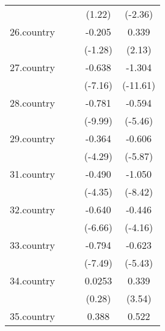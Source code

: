 {\begin{tabular}{l*{4}{c}}
            &                     &                     &      (1.22)         &     (-2.36)         \\
[1em]
26.country  &                     &                     &      -0.205         &       0.339\sym{*}  \\
            &                     &                     &     (-1.28)         &      (2.13)         \\
[1em]
27.country  &                     &                     &      -0.638\sym{***}&      -1.304\sym{***}\\
            &                     &                     &     (-7.16)         &    (-11.61)         \\
[1em]
28.country  &                     &                     &      -0.781\sym{***}&      -0.594\sym{***}\\
            &                     &                     &     (-9.99)         &     (-5.46)         \\
[1em]
29.country  &                     &                     &      -0.364\sym{***}&      -0.606\sym{***}\\
            &                     &                     &     (-4.29)         &     (-5.87)         \\
[1em]
31.country  &                     &                     &      -0.490\sym{***}&      -1.050\sym{***}\\
            &                     &                     &     (-4.35)         &     (-8.42)         \\
[1em]
32.country  &                     &                     &      -0.640\sym{***}&      -0.446\sym{***}\\
            &                     &                     &     (-6.66)         &     (-4.16)         \\
[1em]
33.country  &                     &                     &      -0.794\sym{***}&      -0.623\sym{***}\\
            &                     &                     &     (-7.49)         &     (-5.43)         \\
[1em]
34.country  &                     &                     &      0.0253         &       0.339\sym{***}\\
            &                     &                     &      (0.28)         &      (3.54)         \\
[1em]
35.country  &                     &                     &       0.388\sym{***}&       0.522\sym{***}\\

\end{tabular}}
